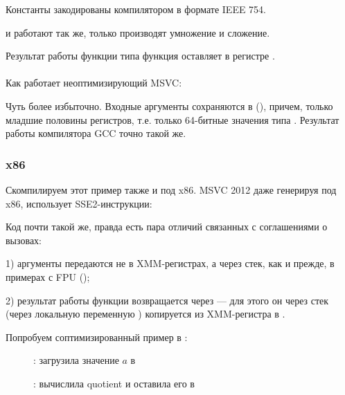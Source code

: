 Константы закодированы компилятором в формате IEEE 754.

 и  работают так же, только производят умножение и сложение.

Результат работы функции типа \Tdouble функция оставляет в регистре .\\
\\
Как работает неоптимизирующий MSVC:



Чуть более избыточно. 
Входные аргументы сохраняются в  (), 
причем, только младшие половины регистров, т.е. только 64-битные значения типа \Tdouble{}.
Результат работы компилятора GCC точно такой же.

\subsubsection{x86}

Скомпилируем этот пример также и под x86. MSVC 2012 даже генерируя под x86, использует SSE2-инструкции:





Код почти такой же, правда есть пара отличий связанных с соглашениями о вызовах:

1) аргументы передаются не в XMM-регистрах, а через стек, как и прежде, в примерах с FPU ();

2) результат работы функции возвращается через  --- для этого он через стек
(через локальную переменную ) копируется из XMM-регистра в .

\clearpage
Попробуем соптимизированный пример в \olly:

\begin{figure}[H]
\centering
{}
\caption{\olly:  загрузила значение $a$ в }
\label{fig:FPU_SIMD_simple_olly1}
\end{figure}

\clearpage
\begin{figure}[H]
\centering
{}
\caption{\olly:  вычислила \gls{quotient} 
и оставила его в }
\label{fig:FPU_SIMD_simple_olly2}
\end{figure}


